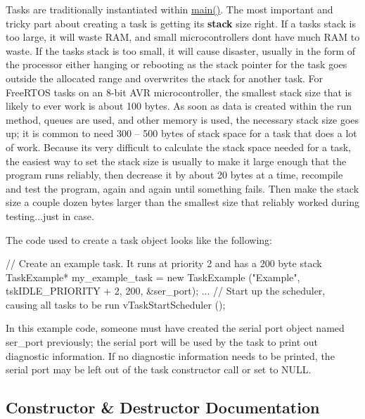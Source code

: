 Tasks are traditionally instantiated within {\ttfamily \mbox{\hyperlink{main_8cpp_a840291bc02cba5474a4cb46a9b9566fe}{main()}}}. The most important and tricky part about creating a task is getting its {\bfseries stack} size right. If a task\textquotesingle{}s stack is too large, it will waste R\+AM, and small microcontrollers don\textquotesingle{}t have much R\+AM to waste. If the task\textquotesingle{}s stack is too small, it will cause disaster, usually in the form of the processor either hanging or rebooting as the stack pointer for the task goes outside the allocated range and overwrites the stack for another task. For Free\+R\+T\+OS tasks on an 8-\/bit A\+VR microcontroller, the smallest stack size that is likely to ever work is about 100 bytes. As soon as data is created within the run method, queues are used, and other memory is used, the necessary stack size goes up; it is common to need 300 -- 500 bytes of stack space for a task that does a lot of work. Because it\textquotesingle{}s very difficult to calculate the stack space needed for a task, the easiest way to set the stack size is usually to make it large enough that the program runs reliably, then decrease it by about 20 bytes at a time, recompile and test the program, again and again until something fails. Then make the stack size a couple dozen bytes larger than the smallest size that reliably worked during testing...just in case.

The code used to create a task object looks like the following\+: 
\begin{DoxyCode}
\textcolor{comment}{// Create an example task. It runs at priority 2 and has a 200 byte stack}
TaskExample* my\_example\_task 
    = \textcolor{keyword}{new} TaskExample (\textcolor{stringliteral}{"Example"}, tskIDLE\_PRIORITY + 2, 200, &ser\_port);
...
\textcolor{comment}{// Start up the scheduler, causing all tasks to be run}
vTaskStartScheduler ();
\end{DoxyCode}
 In this example code, someone must have created the serial port object named {\ttfamily ser\+\_\+port} previously; the serial port will be used by the task to print out diagnostic information. If no diagnostic information needs to be printed, the serial port may be left out of the task constructor call or set to {\ttfamily N\+U\+LL}. 

\subsection{Constructor \& Destructor Documentation}
\mbox{\label{class_task_base_ae8e359a838bed17302e4f21146dba612}} 
